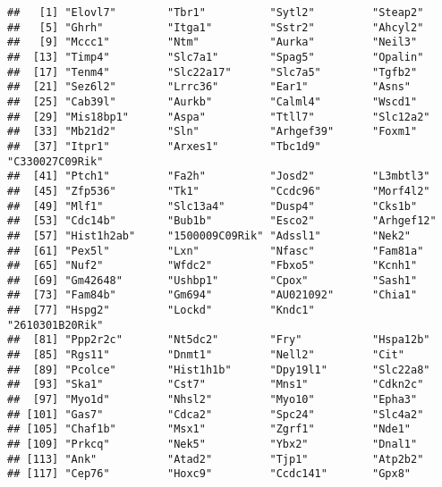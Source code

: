 \documentclass[
]{article}
\newenvironment{Shaded}{\begin{snugshade}}{\end{snugshade}}
\newcommand{\NormalTok}[1]{#1}
\newcommand{\OperatorTok}[1]{\textcolor[rgb]{0.81,0.36,0.00}{\textbf{#1}}}
\newcommand{\StringTok}[1]{\textcolor[rgb]{0.31,0.60,0.02}{#1}}
\begin{document}
\begin{Shaded}
\end{Shaded}

\begin{verbatim}
##   [1] "Elovl7"        "Tbr1"          "Sytl2"         "Steap2"       
##   [5] "Ghrh"          "Itga1"         "Sstr2"         "Ahcyl2"       
##   [9] "Mccc1"         "Ntm"           "Aurka"         "Neil3"        
##  [13] "Timp4"         "Slc7a1"        "Spag5"         "Opalin"       
##  [17] "Tenm4"         "Slc22a17"      "Slc7a5"        "Tgfb2"        
##  [21] "Sez6l2"        "Lrrc36"        "Ear1"          "Asns"         
##  [25] "Cab39l"        "Aurkb"         "Calml4"        "Wscd1"        
##  [29] "Mis18bp1"      "Aspa"          "Ttll7"         "Slc12a2"      
##  [33] "Mb21d2"        "Sln"           "Arhgef39"      "Foxm1"        
##  [37] "Itpr1"         "Arxes1"        "Tbc1d9"        "C330027C09Rik"
##  [41] "Ptch1"         "Fa2h"          "Josd2"         "L3mbtl3"      
##  [45] "Zfp536"        "Tk1"           "Ccdc96"        "Morf4l2"      
##  [49] "Mlf1"          "Slc13a4"       "Dusp4"         "Cks1b"        
##  [53] "Cdc14b"        "Bub1b"         "Esco2"         "Arhgef12"     
##  [57] "Hist1h2ab"     "1500009C09Rik" "Adssl1"        "Nek2"         
##  [61] "Pex5l"         "Lxn"           "Nfasc"         "Fam81a"       
##  [65] "Nuf2"          "Wfdc2"         "Fbxo5"         "Kcnh1"        
##  [69] "Gm42648"       "Ushbp1"        "Cpox"          "Sash1"        
##  [73] "Fam84b"        "Gm694"         "AU021092"      "Chia1"        
##  [77] "Hspg2"         "Lockd"         "Kndc1"         "2610301B20Rik"
##  [81] "Ppp2r2c"       "Nt5dc2"        "Fry"           "Hspa12b"      
##  [85] "Rgs11"         "Dnmt1"         "Nell2"         "Cit"          
##  [89] "Pcolce"        "Hist1h1b"      "Dpy19l1"       "Slc22a8"      
##  [93] "Ska1"          "Cst7"          "Mns1"          "Cdkn2c"       
##  [97] "Myo1d"         "Nhsl2"         "Myo10"         "Epha3"        
## [101] "Gas7"          "Cdca2"         "Spc24"         "Slc4a2"       
## [105] "Chaf1b"        "Msx1"          "Zgrf1"         "Nde1"         
## [109] "Prkcq"         "Nek5"          "Ybx2"          "Dnal1"        
## [113] "Ank"           "Atad2"         "Tjp1"          "Atp2b2"       
## [117] "Cep76"         "Hoxc9"         "Ccdc141"       "Gpx8"         

\end{verbatim}
\end{document}
